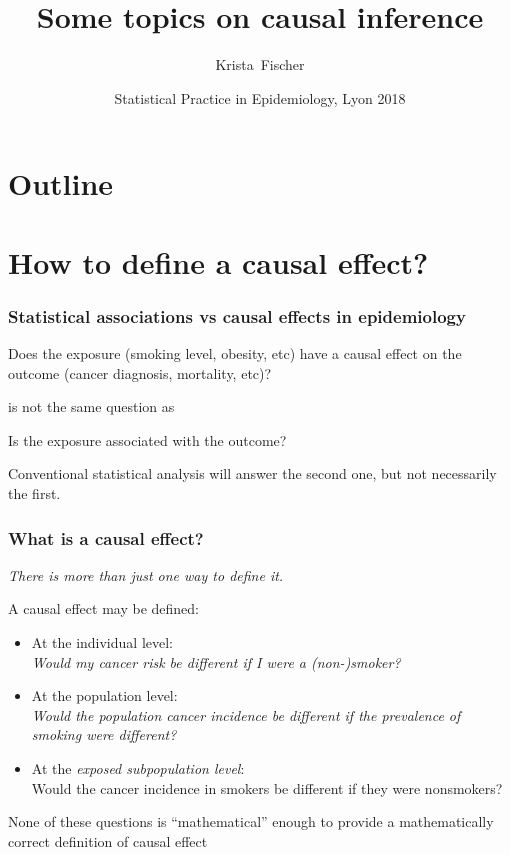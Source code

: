 \documentclass[xcolor=svgnames,handout]{beamer}
\title{Some topics on causal inference}
\author{Krista~Fischer}
\institute[TY] %
{
   Estonian Genome Center, University of Tartu, Estonia
}
\date[Lyon 2018] %
{Statistical Practice in Epidemiology, Lyon 2018}
\begin{document}
\begin{frame}
  \titlepage
\end{frame}

\section*{Outline}
\begin{frame}
\tableofcontents
\end{frame}

\section{How to define a causal effect?}

\begin{frame}
  \frametitle{Statistical associations vs causal effects in epidemiology}
  \begin{block}{}
  Does the exposure (smoking level, obesity, etc) have a \alert<2>{causal effect} on the outcome (cancer diagnosis, mortality, etc)?
  \end{block}
is not the same question as   
 \begin{block}{}
  Is the exposure \alert<3>{associated} with the outcome?
  \end{block}
 Conventional statistical analysis will answer the second one, but not necessarily the first. 
\end{frame}

\begin{frame}
  \frametitle{What is a causal effect?}
  
 \emph{There is more than just one way to define it.}
 
 A causal effect may be defined:
  \begin{itemize}
  \item At the \alert<1>{individual level}: \\
  \alert<1>{\textit{Would my cancer risk be different if I were a (non-)smoker?}}
  \item At the \alert<2>{population level}: \\
  \alert<2>{\textit{Would the population cancer incidence be different if the prevalence of smoking were different?}}
  \item At the \alert<3>{\textit{exposed subpopulation level}}: \\
  \alert<3>{Would the cancer incidence in smokers be different if they were nonsmokers?}
  \end{itemize}
\alert<4>{
None of these questions is ``mathematical'' enough to provide a mathematically correct definition of causal effect 
}
\end{frame}
\end{document}
